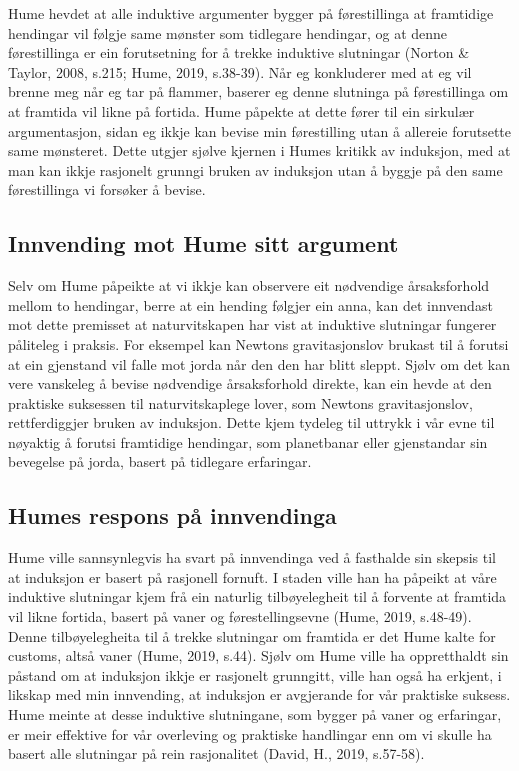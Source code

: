 \documentclass[
  letterpaper,
  DIV=11,
  numbers=noendperiod]{scrreprt}
\begin{document}
Hume hevdet at alle induktive argumenter bygger på førestillinga at
framtidige hendingar vil følgje same mønster som tidlegare hendingar, og
at denne førestillinga er ein forutsetning for å trekke induktive
slutningar (Norton \& Taylor, 2008, s.215; Hume, 2019, s.38-39). Når eg
konkluderer med at eg vil brenne meg når eg tar på flammer, baserer eg
denne slutninga på førestillinga om at framtida vil likne på fortida.
Hume påpekte at dette fører til ein sirkulær argumentasjon, sidan eg
ikkje kan bevise min førestilling utan å allereie forutsette same
mønsteret. Dette utgjer sjølve kjernen i Humes kritikk av induksjon, med
at man kan ikkje rasjonelt grunngi bruken av induksjon utan å byggje på
den same førestillinga vi forsøker å bevise.

\subsection{Innvending mot Hume sitt
argument}\label{innvending-mot-hume-sitt-argument}

Selv om Hume påpeikte at vi ikkje kan observere eit nødvendige
årsaksforhold mellom to hendingar, berre at ein hending følgjer ein
anna, kan det innvendast mot dette premisset at naturvitskapen har vist
at induktive slutningar fungerer påliteleg i praksis. For eksempel kan
Newtons gravitasjonslov brukast til å forutsi at ein gjenstand vil falle
mot jorda når den den har blitt sleppt. Sjølv om det kan vere vanskeleg
å bevise nødvendige årsaksforhold direkte, kan ein hevde at den
praktiske suksessen til naturvitskaplege lover, som Newtons
gravitasjonslov, rettferdiggjer bruken av induksjon. Dette kjem tydeleg
til uttrykk i vår evne til nøyaktig å forutsi framtidige hendingar, som
planetbanar eller gjenstandar sin bevegelse på jorda, basert på
tidlegare erfaringar.

\subsection{Humes respons på
innvendinga}\label{humes-respons-puxe5-innvendinga}

Hume ville sannsynlegvis ha svart på innvendinga ved å fasthalde sin
skepsis til at induksjon er basert på rasjonell fornuft. I staden ville
han ha påpeikt at våre induktive slutningar kjem frå ein naturlig
tilbøyelegheit til å forvente at framtida vil likne fortida, basert på
vaner og førestellingsevne (Hume, 2019, s.48-49). Denne tilbøyelegheita
til å trekke slutningar om framtida er det Hume kalte for customs, altså
vaner (Hume, 2019, s.44). Sjølv om Hume ville ha oppretthaldt sin
påstand om at induksjon ikkje er rasjonelt grunngitt, ville han også ha
erkjent, i likskap med min innvending, at induksjon er avgjerande for
vår praktiske suksess. Hume meinte at desse induktive slutningane, som
bygger på vaner og erfaringar, er meir effektive for vår overleving og
praktiske handlingar enn om vi skulle ha basert alle slutningar på rein
rasjonalitet (David, H., 2019, s.57-58).
\end{document}
